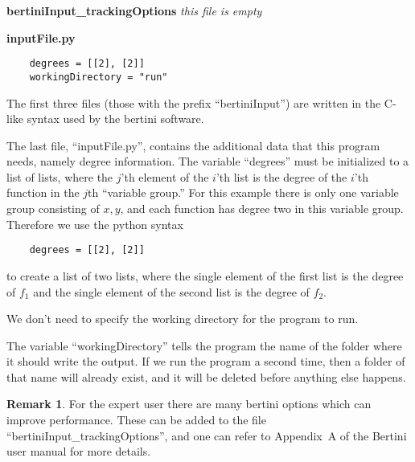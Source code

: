 \documentclass[12pt]{article}
\theoremstyle{definition}
\newtheorem{remark}{Remark}[section]
\newcommand{\red}[1]{{\color{red}#1}}
\begin{document}
\noindent \textbf{bertiniInput\_trackingOptions}
\emph{this file is empty}

\noindent \textbf{inputFile.py}

\begin{leftbar}
\vspace{-10pt} 
\begin{verbatim}
    degrees = [[2], [2]]
    workingDirectory = "run"
\end{verbatim}\vspace{-10pt} 
\end{leftbar}

The first three files (those with the prefix ``bertiniInput'') are 
written in the C-like syntax used by the bertini software. 

The last 
file, ``inputFile.py'', contains the additional data that this 
program needs, namely degree information. 
The variable ``degrees'' must be initialized to a list of lists, where 
the $j$'th element of the $i$'th list is the degree of the $i$'th 
function in the $j$th ``variable group.'' For this example there is only 
one variable group consisting of $x,y$, and each function has degree two 
in this variable group. Therefore we use the python syntax
%
\begin{leftbar}
\vspace{-10pt} 
\begin{verbatim}
    degrees = [[2], [2]]
\end{verbatim}\vspace{-10pt} 
\end{leftbar}
\noindent to create a list of two lists, where the single element of the first 
list is the degree of $f_1$ and the single element of the second list is 
the degree of $f_2$.

\red{We don't need to specify the working directory for the program to run. 
 }
 
The variable ``workingDirectory'' tells the program the name of the 
folder where it should write the output. If we run the program a second 
time, then a folder of that name will already exist, and it will be 
deleted before anything else happens.

\begin{remark}
For the expert user there are many bertini options which can 
improve performance. These can be added 
to the file ``bertiniInput\_trackingOptions'', and one can refer to Appendix~A of the  Bertini user manual for more details. 
\end{remark}
\end{document}
